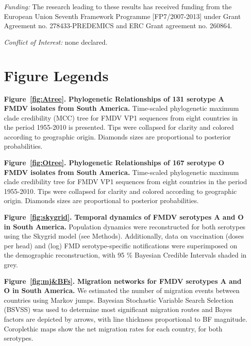 \documentclass[10pt]{article}
\begin{document}
\emph{Funding:} The research leading to these results has received funding from the European Union Seventh Framework Programme [FP7/2007-2013] under Grant Agreement no. 278433-PREDEMICS and ERC Grant agreement no. 260864.

\emph{Conflict of Interest:} none declared.

\newpage

\newpage
\section*{Figure Legends}

{\bf Figure~\ref{fig:Atree}. Phylogenetic Relationships of 131 serotype A FMDV isolates from South America.} Time-scaled phylogenetic maximum clade credibility (MCC) tree for FMDV VP1 sequences from eight countries in the period 1955-2010 is presented. Tips were collapsed for clarity and colored according to geographic origin. Diamonds sizes are proportional to posterior probabilities.

{\bf Figure~\ref{fig:Otree}. Phylogenetic Relationships of 167 serotype O FMDV isolates from South America.} Time-scaled phylogenetic maximum clade credibility tree for FMDV VP1 sequences from eight countries in the period 1955-2010. Tips were collapsed for clarity and colored according to geographic origin. Diamonds sizes are proportional to posterior probabilities.

{\bf Figure~\ref{fig:skygrid}. Temporal dynamics of FMDV serotypes A and O in South America.} Population dynamics were reconstructed for both serotypes using the Skygrid model (see Methods). Additionally, data on vaccination  (doses per head) and (log) FMD serotype-specific notifications were superimposed on the demographic reconstruction, with 95 \% Bayesian Credible Intervals shaded in grey.

{\bf Figure~\ref{fig:mj&BFs}. Migration networks for FMDV serotypes A and O in South America.} We estimated the number of migration events between countries using Markov jumps.  Bayesian Stochastic Variable Search Selection (BSVSS) was used to determine most significant migration routes and Bayes factors are depicted by arrows, with line thickness proportional to BF magnitude. Coroplethic maps show the net migration rates for each country, for both serotypes.
\end{document}
